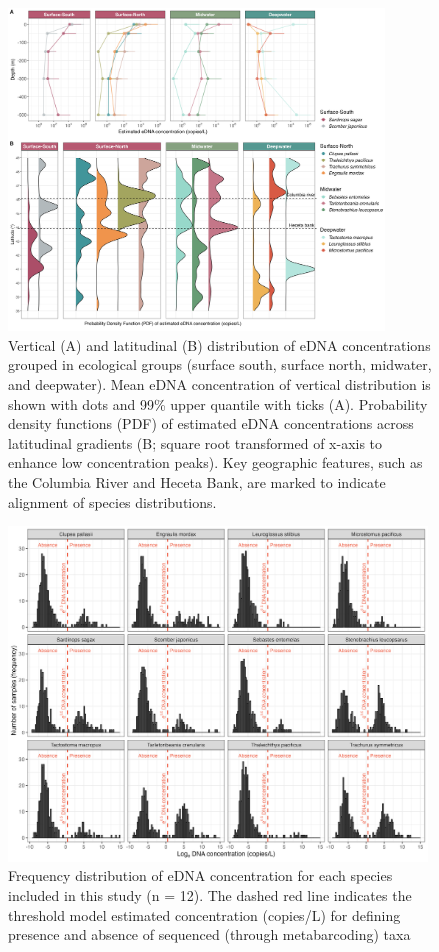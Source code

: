 \documentclass{article}
\begin{document}
\begin{figure}
\centering
\includegraphics[width=0.89\textwidth]{plots/4_Figure_4.jpg}
\caption{Vertical (A) and latitudinal (B) distribution of eDNA concentrations grouped in ecological groups (surface south, surface north, midwater, and deepwater). Mean eDNA concentration of vertical distribution is shown with dots and 99\% upper quantile with ticks (A). Probability density functions (PDF) of estimated eDNA concentrations across latitudinal gradients (B; square root transformed of x-axis to enhance low concentration peaks). Key geographic features, such as the Columbia River and Heceta Bank, are marked to indicate alignment of species distributions.}
\end{figure}

\begin{figure}
\centering
\includegraphics[width=0.99\textwidth]{plots/6_Supplementary_Figure_2.jpg}
\caption{Frequency distribution of eDNA concentration for each species included in this study (n = 12). The dashed red line indicates the threshold model estimated concentration (copies/L) for defining presence and absence of sequenced (through metabarcoding) taxa}
\end{figure}
\end{document}
